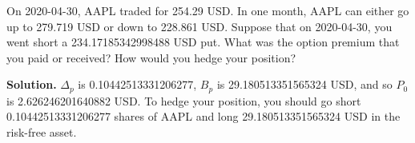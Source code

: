 \noindent On 2020-04-30, AAPL traded for 254.29 USD. In one month, AAPL can either go up to 279.719 USD or down to 228.861 USD. Suppose that on 2020-04-30, you went short a 234.17185342998488 USD put. What was the option premium that you paid or received? How would you hedge your position?

\vspace{9pt}

\noindent\textbf{Solution.} $\Delta_{p}$ is 0.10442513331206277, $B_{p}$ is 29.180513351565324 USD, and so $P_{0}$ is 2.626246201640882 USD. To hedge your position, you should go short 0.10442513331206277 shares of AAPL and long 29.180513351565324 USD in the risk-free asset.
